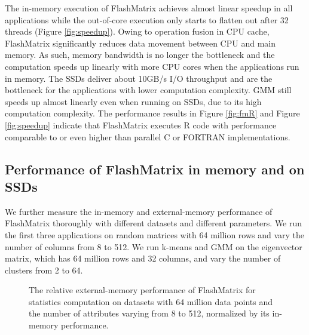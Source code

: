 The in-memory execution of FlashMatrix achieves almost linear speedup in all
applications while the out-of-core execution only
starts to flatten out after 32 threads (Figure \ref{fig:speedup}). Owing to
operation fusion in CPU cache, FlashMatrix significantly reduces data movement
between CPU and main memory. As such, memory bandwidth is no longer
the bottleneck and the computation speeds up linearly with more CPU cores
when the applications run in memory. The SSDs deliver about 10GB/s I/O throughput
and are the bottleneck for the applications with lower computation complexity.
GMM still speeds up almost linearly even when running on SSDs, due to its high
computation complexity. The performance results in Figure \ref{fig:fmR} and Figure
\ref{fig:speedup} indicate that FlashMatrix executes R code with performance
comparable to or even higher than parallel C or FORTRAN implementations.

%		

\subsection{Performance of FlashMatrix in memory and on SSDs}

We further measure the in-memory and external-memory performance of FlashMatrix
thoroughly with different datasets and
different parameters. We run the first three applications on random matrices
with 64 million rows and vary the number of columns from 8 to 512. We run k-means
and GMM on the eigenvector matrix, which has 64 million rows and 32 columns, and
vary the number of clusters from 2 to 64.

\begin{figure}
	\begin{center}
		\footnotesize
		\vspace{-15pt}
		
		\vspace{-10pt}
		\caption{The relative external-memory performance of FlashMatrix for
			statistics computation on datasets with 64 million data points
			and the number of attributes varying from 8 to 512, normalized by
		its in-memory performance.}
		\label{perf:stat}
	\end{center}
\end{figure}

